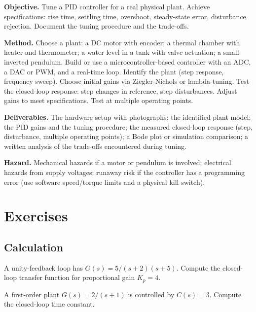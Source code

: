 \begin{project}
\textbf{Objective.} Tune a PID controller for a real physical plant. Achieve specifications: rise time, settling time, overshoot, steady-state error, disturbance rejection. Document the tuning procedure and the trade-offs.

\textbf{Method.} Choose a plant: a DC motor with encoder; a thermal chamber with heater and thermometer; a water level in a tank with valve actuation; a small inverted pendulum. Build or use a microcontroller-based controller with an ADC, a DAC or PWM, and a real-time loop. Identify the plant (step response, frequency sweep). Choose initial gains via Ziegler-Nichols or lambda-tuning. Test the closed-loop response: step changes in reference, step disturbances. Adjust gains to meet specifications. Test at multiple operating points.

\textbf{Deliverables.} The hardware setup with photographs; the identified plant model; the PID gains and the tuning procedure; the measured closed-loop response (step, disturbance, multiple operating points); a Bode plot or simulation comparison; a written analysis of the trade-offs encountered during tuning.

\textbf{Hazard.} Mechanical hazards if a motor or pendulum is involved; electrical hazards from supply voltages; runaway risk if the controller has a programming error (use software speed/torque limits and a physical kill switch).
\end{project}

\section{Exercises}

\subsection*{Calculation}

\begin{exercise}
A unity-feedback loop has $G(s) = 5/(s+2)(s+5)$. Compute the closed-loop transfer function for proportional gain $K_p = 4$.
\end{exercise}

\begin{exercise}
A first-order plant $G(s) = 2/(s+1)$ is controlled by $C(s) = 3$. Compute the closed-loop time constant.
\end{exercise}

